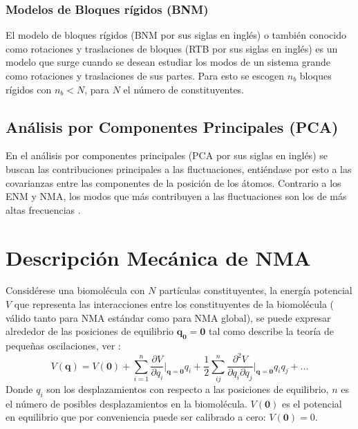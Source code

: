 \subsubsection{Modelos de Bloques r\'{i}gidos (BNM)}
El modelo de bloques r\'{i}gidos (BNM por sus siglas en ingl\'{e}s) o tambi\'{e}n conocido como rotaciones y traslaciones de bloques (RTB por sus siglas en ingl\'{e}s) es un modelo que surge cuando se desean estudiar  los modos de un sistema grande como rotaciones y traslaciones de sus partes. Para esto se escogen $n_b$ bloques r\'{i}gidos con $n_b<N$, para $N$ el n\'{u}mero de constituyentes.\\

\subsection{An\'{a}lisis por Componentes Principales (PCA)}
En el an\'{a}lisis por componentes principales (PCA por sus siglas en ingl\'{e}s) se buscan las contribuciones principales a las fluctuaciones, enti\'{e}ndase por esto a las covarianzas entre las componentes de la posici\'{o}n de los \'{a}tomos. Contrario a los ENM y NMA, los modos que m\'{a}s contribuyen a las fluctuaciones son los de m\'{a}s altas frecuencias \cite{Amadei1993}.
\section{Descripci\'{o}n Mec\'{a}nica de NMA}\label{sec:MecNMA}

Consid\'{e}rese una biomol\'{e}cula con $N$ part\'{i}culas constituyentes, la energ\'{i}a potencial $V$ que representa las interacciones entre los constituyentes de la biomol\'{e}cula ( v\'{a}lido tanto para NMA est\'{a}ndar como para NMA global), se puede expresar alrededor de las posiciones de equilibrio $\mathbf{q_0}=\mathbf{0}$ tal como describe la teor\'{i}a de peque\~{n}as oscilaciones, ver \cite{Goldstein2001}:
\begin{equation}\label{eq:1}
V(\mathbf{q})=V(\mathbf{0})+\sum_{i=1}^n\frac{\partial V}{\partial q_i}\bigg|_{\mathbf{q}=\mathbf{0}}q_i+\frac{1}{2}\sum_{ij}^{n}\frac{\partial^2 V }{\partial q_i\partial q_j}\bigg|_{\mathbf{q}=\mathbf{0}}q_i q_j+...
\end{equation}
Donde $q_i$ son los desplazamientos con respecto a las posiciones de equilibrio, $n$ es el n\'{u}mero de posibles desplazamientos en la biomol\'{e}cula. $V(\mathbf{0})$ es el potencial en equilibrio que por conveniencia puede ser calibrado a cero: $V(\mathbf{0})=0$. \\


